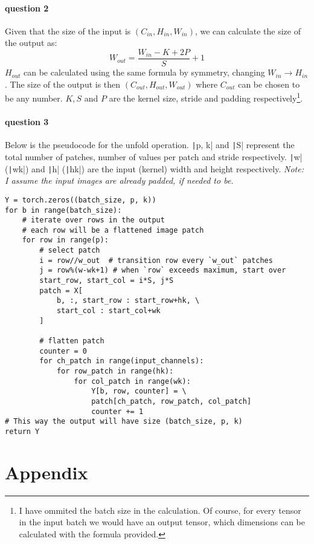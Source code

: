 \documentclass{article}
\begin{document}
\paragraph{question 2} Given that the size of the input is \((C_{in}, H_{in}, W_{in})\), we can calculate the size of the output as:
\[
    W_{out} = \frac{W_{in} - K + 2P}{S} + 1
\]
\(H_{out}\) can be calculated using the same formula by symmetry, changing \(W_{in} \rightarrow H_{in}\). The size of the output is then \((C_{out}, H_{out}, W_{out})\) where \(C_{out}\) can be chosen to be any number. \(K, S\) and \(P\) are the kernel size, stride and padding respectively\footnote{I have ommited the batch size in the calculation. Of course, for every tensor in the input batch we would have an output tensor, which dimensions can be calculated with the formula provided.}.

\paragraph{question 3} Below is the pseudocode for the unfold operation. \texttt|p, k| and \texttt|S| represent the total number of patches, number of values per patch and stride respectively. \texttt|w| (\texttt|wk|) and \texttt|h| (\texttt|hk|) are the input (kernel) width and height respectively. \emph{Note: I assume the input images are already padded, if needed to be.}

\begin{verbatim}
Y = torch.zeros((batch_size, p, k))
for b in range(batch_size):
    # iterate over rows in the output
    # each row will be a flattened image patch
    for row in range(p):
        # select patch
        i = row//w_out  # transition row every `w_out` patches
        j = row%(w-wk+1) # when `row` exceeds maximum, start over
        start_row, start_col = i*S, j*S
        patch = X[
            b, :, start_row : start_row+hk, \
            start_col : start_col+wk
        ]

        # flatten patch
        counter = 0
        for ch_patch in range(input_channels):
            for row_patch in range(hk):
                for col_patch in range(wk):
                    Y[b, row, counter] = \
                    patch[ch_patch, row_patch, col_patch]
                    counter += 1
# This way the output will have size (batch_size, p, k)
return Y
\end{verbatim}

\paragraph{} 

\pagebreak %

\appendix
\section{Appendix}
\end{document}
